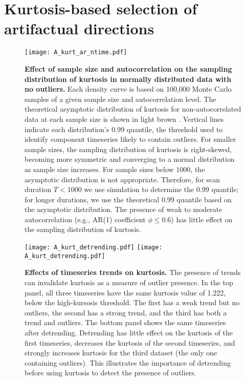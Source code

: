 \documentclass{article}
\begin{document}
\newpage
\section{Kurtosis-based selection of artifactual directions}\label{app:kurtosis}

\begin{figure}[H]
    \centering
    \texttt{[image: A\_kurt\_ar\_ntime.pdf]}
    \caption{\small \textbf{Effect of sample size and autocorrelation on the sampling distribution of kurtosis in normally distributed data with no outliers.} Each density curve is based on 100,000 Monte Carlo samples of a given sample size and autocorrelation level. The theoretical asymptotic distribution of kurtosis for non-autocorrelated data at each sample size is shown in light brown \citep{fisherMomentsDistributionNormal1930}. Vertical lines indicate each distribution's 0.99 quantile, the threshold used to identify component timeseries likely to contain outliers. For smaller sample sizes, the sampling distribution of kurtosis is right-skewed, becoming more symmetric and converging to a normal distribution as sample size increases. For sample sizes below $1000$, the asymptotic distribution is not appropriate. Therefore, for scan duration $T<1000$ we use simulation to determine the $0.99$ quantile; for longer durations, we use the theoretical $0.99$ quantile based on the asymptotic distribution. The presence of weak to moderate autocorrelation (e.g., AR(1) coefficient $\phi\leq 0.6$) has little effect on the sampling distribution of kurtosis.}
    \label{app:fig:KurtAR}
\end{figure}


\begin{figure}[H]
    \centering
    \texttt{[image: A\_kurt\_detrending.pdf]}
    \texttt{[image: A\_kurt\_detrending.pdf]}
    \caption{\small \textbf{Effects of timeseries trends on kurtosis.} The presence of trends can invalidate kurtosis as a measure of outlier presence. In the top panel, all three timeseries have the same kurtosis value of 1.222, below the high-kursosis threshold. The first has a weak trend but no outliers, the second has a strong trend, and the third has both a trend and outliers. The bottom panel shows the same timeseries after detrending. Detrending has little effect on the kurtosis of the first timeseries, decreases the kurtosis of the second timeseries, and strongly increases kurtosis for the third dataset (the only one containing outliers). This illustrates the importance of detrending before using kurtosis to detect the presence of outliers.}
    \label{app:fig:KurtTrends}
\end{figure}
\end{document}
